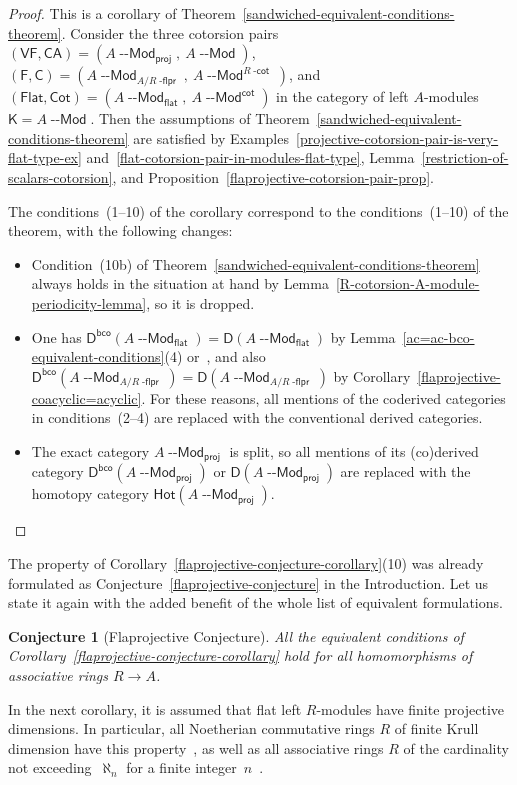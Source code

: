 \documentclass[12pt,a4paper]{amsart}
\newcommand{\+}{\nobreakdash-}
\renewcommand{\:}{\colon}
\newcommand{\rarrow}{\longrightarrow}
\newcommand{\Modl}{{\operatorname{\mathsf{--Mod}}}}
\newcommand{\sC}{\mathsf C}
\newcommand{\sD}{\mathsf D}
\newcommand{\sF}{\mathsf F}
\newcommand{\sK}{\mathsf K}
\newcommand{\VF}{\mathsf{VF}}
\newcommand{\CA}{\mathsf{CA}}
\newcommand{\Flat}{\mathsf{Flat}}
\newcommand{\Cot}{\mathsf{Cot}}
\newcommand{\Hot}{\mathsf{Hot}}
\newcommand{\proj}{\mathsf{proj}}
\renewcommand{\flat}{\mathsf{flat}}
\renewcommand{\cot}{\mathsf{cot}}
\newcommand{\bco}{\mathsf{bco}}
\newcommand{\dcot}{{\operatorname{\mathsf{-cot}}}}
\newcommand{\dflpr}{{\operatorname{\mathsf{-flpr}}}}
\theoremstyle{plain}
\newtheorem{conj}[thm]{Conjecture}
\theoremstyle{definition}
\begin{document}
\begin{proof}
 This is a corollary of
Theorem~\ref{sandwiched-equivalent-conditions-theorem}.
 Consider the three cotorsion pairs
$(\VF,\CA)\allowbreak=(A\Modl_\proj,\>A\Modl)$,
\ $(\sF,\sC)=(A\Modl_{A/R\dflpr},\>A\Modl^{R\dcot})$, and
$(\Flat,\Cot)=(A\Modl_\flat,\>A\Modl^\cot)$ in the category of left
$A$\+modules $\sK=A\Modl$.
 Then the assumptions of
Theorem~\ref{sandwiched-equivalent-conditions-theorem} are satisfied
by Examples~\ref{projective-cotorsion-pair-is-very-flat-type-ex}
and~\ref{flat-cotorsion-pair-in-modules-flat-type},
Lemma~\ref{restriction-of-scalars-cotorsion},
and Proposition~\ref{flaprojective-cotorsion-pair-prop}.

 The conditions~(1\+-10) of the corollary correspond to
the conditions~(1\+-10) of the theorem, with the following changes:
\begin{itemize}
\item Condition~(10b) of
Theorem~\ref{sandwiched-equivalent-conditions-theorem} always holds
in the situation at hand by
Lemma~\ref{R-cotorsion-A-module-periodicity-lemma}, so it is dropped.
\item One has $\sD^\bco(A\Modl_\flat)=\sD(A\Modl_\flat)$ by
Lemma~\ref{ac=ac-bco-equivalent-conditions}(4)
or~\cite[Theorem~7.18]{Pphil}, and also
$\sD^\bco(A\Modl_{A/R\dflpr})=\sD(A\Modl_{A/R\dflpr})$
by Corollary~\ref{flaprojective-coacyclic=acyclic}.
 For these reasons, all mentions of the coderived categories in
conditions~(2\+-4) are replaced with the conventional
derived categories.
\item The exact category $A\Modl_\proj$ is split, so all mentions of
its (co)derived category $\sD^\bco(A\Modl_\proj)$ or
$\sD(A\Modl_\proj)$ are replaced with the homotopy category
$\Hot(A\Modl_\proj)$.
\end{itemize}
\end{proof}

 The property of Corollary~\ref{flaprojective-conjecture-corollary}(10)
was already formulated as
Conjecture~\ref{flaprojective-conjecture} in the Introduction.
 Let us state it again with the added benefit of the whole list of
equivalent formulations.

\begin{conj}[Flaprojective Conjecture]
 All the equivalent conditions of
Corollary~\ref{flaprojective-conjecture-corollary} hold for all
homomorphisms of associative rings $R\rarrow A$.
\end{conj}

 In the next corollary, it is assumed that flat left $R$\+modules
have finite projective dimensions.
 In particular, all Noetherian commutative rings $R$ of finite Krull
dimension have this property~\cite[Corollaire~II.3.2.7]{RG}, as well as
all associative rings $R$ of the cardinality not exceeding~$\aleph_n$
for a finite integer~$n$ \,\cite[Th\'eor\`eme~7.10]{GJ}.
\end{document}
